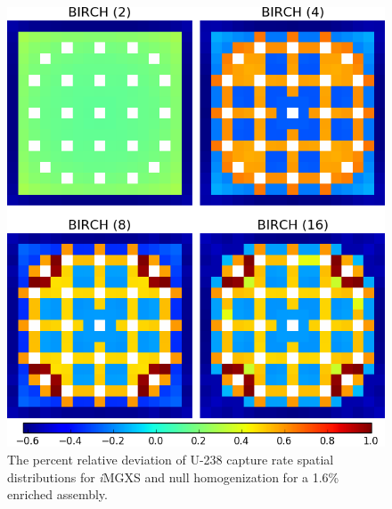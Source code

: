 \begin{figure}[h!]
\centering
\includegraphics[width=0.9\linewidth]{figures/results/compare/assm-16/compare-capt}
\vspace{2mm}
\caption[U-238 capture rate \textit{i}MGXS-to-null relative deviations]{The percent relative deviation of U-238 capture rate spatial distributions for \textit{i}\ac{MGXS} and null homogenization for a 1.6\% enriched assembly.}
\label{fig:chap11-assm-1.6-capt-rates-comp}
\end{figure}

\clearpage

